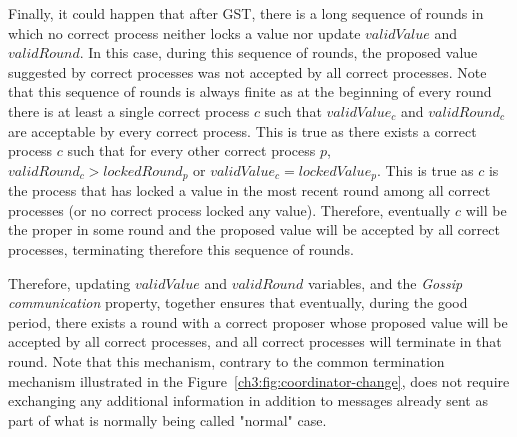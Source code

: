 Finally, it could happen that after GST, there is a long sequence of rounds in which 
no correct process neither locks a value nor update $validValue$ and $validRound$. 
In this case, during this sequence of rounds, the proposed value suggested by correct
processes was not accepted by all correct processes. Note that this sequence of rounds 
is always finite as at the beginning of every
round there is at least a single correct process $c$ such that $validValue_c$
and $validRound_c$ are acceptable by every correct process. This is true as
there exists a correct process $c$ such that for every other correct process
$p$, $validRound_c > lockedRound_p$ or $validValue_c = lockedValue_p$. This is
true as $c$ is the process that has locked a value in the most recent round
among all correct processes (or no correct process locked any value). Therefore,
eventually $c$ will be the proper in some round and the proposed value will be accepted
by all correct processes, terminating therefore this sequence of 
rounds. 

Therefore, updating $validValue$ and $validRound$ variables, and the
\emph{Gossip communication} property, together ensures that eventually, during
the good period, there exists a round with a correct proposer whose proposed
value will be accepted by all correct processes, and all correct processes will
terminate in that round. Note that this mechanism, contrary to the common
termination mechanism illustrated in the
Figure~\ref{ch3:fig:coordinator-change}, does not require exchanging any
additional information in addition to messages already sent as part of what is
normally being called "normal" case.     

